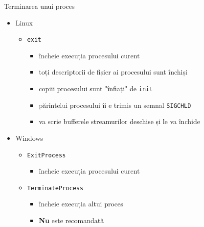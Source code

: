 \documentclass{so.cs.pub.ro}
\begin{document}
\begin{frame}{Terminarea unui proces}
	\begin{itemize}
		\item Linux
		\begin{itemize}
			\item \texttt{exit}
			\begin{itemize}
				\item încheie execuția procesului curent			
				\item toți descriptorii de fișier ai procesului sunt închiși
				\item copiii procesului sunt "înfiați" de \texttt{init}
				\item părintelui procesului îi e trimis un semnal \texttt{SIGCHLD}
				\item va scrie bufferele streamurilor deschise și le va închide
			\end{itemize}		
		\end{itemize}
		\vspace*{0.1cm}
		\item Windows
		\begin{itemize}
			\item \texttt{ExitProcess}
			\begin{itemize}
				\item încheie execuția procesului curent
			\end{itemize}
			\item \texttt{TerminateProcess}			
			\begin{itemize}
				\item încheie execuția altui proces
				\item \textbf{Nu} este recomandată 
			\end{itemize}			
		\end{itemize}
	\end{itemize}
\end{frame}
\end{document}
